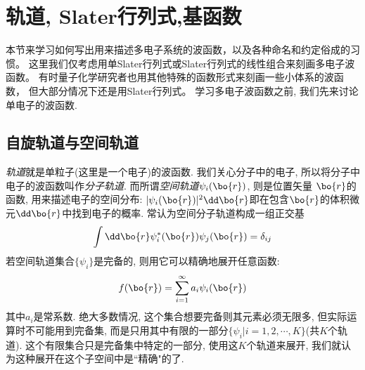 \section{轨道, Slater行列式,基函数}
\label{sec2.2}
本节来学习如何写出用来描述多电子系统的波函数，以及各种命名和约定俗成的习惯。
这里我们仅考虑用单Slater行列式或Slater行列式的线性组合来刻画多电子波函数。
有时量子化学研究者也用其他特殊的函数形式来刻画一些小体系的波函数，
但大部分情况下还是用Slater行列式。
学习多电子波函数之前, 我们先来讨论单电子的波函数.
 
\subsection{自旋轨道与空间轨道}
\label{sec2.2.1}
\emph{轨道}就是单粒子(这里是一个电子)的波函数. 
我们关心分子中的电子, 所以将分子中电子的波函数叫作\emph{分子轨道}. 
而所谓\emph{空间轨道}$\psi_i(\bo{r})$, 则是位置矢量 $\bo{r}$的函数, 用来描述电子的空间分布: 
$|\psi_i(\bo{r})|^2\dd \bo{r}$即在包含$\bo{r}$的体积微元$\dd\bo{r}$中找到电子的概率. 
常认为空间分子轨道构成一组正交基
\begin{equation}
\int\dd\bo{r}\psi_i^*(\bo{r})\psi_j(\bo{r})=\delta_{ij}
\end{equation}
若空间轨道集合$\{\psi_i \}$是完备的, 则用它可以精确地展开任意函数:
\begin{equation}
f(\bo{r})=\sum_{i=1}^{\infty}a_i\psi_i(\bo{r})
\end{equation}
其中$a_i$是常系数. 
绝大多数情况, 
这个集合想要完备则其元素必须无限多, 
但实际运算时不可能用到完备集, 
而是只用其中有限的一部分$\{\psi_i|i=1,2,\cdots,K\}$(共$K$个轨道). 
这个有限集合只是完备集中特定的一部分, 
使用这$K$个轨道来展开, 
我们就认为这种展开在这个子空间中是``精确"的了.


